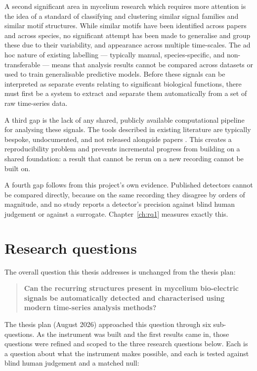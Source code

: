 A second significant area in mycelium research which requires more attention is the idea of a standard of classifying and clustering similar signal families and similar motif structures. While similar motifs have been identified across papers and across species, no significant attempt has been made to generalise and group these due to their variability, and appearance across multiple time-scales. The ad hoc nature of existing labelling --- typically manual, species-specific, and non-transferable --- means that analysis results cannot be compared across datasets or used to train generalisable predictive models. Before these signals can be interpreted as separate events relating to significant biological functions, there must first be a system to extract and separate them automatically from a set of raw time-series data.

A third gap is the lack of any shared, publicly available computational pipeline for analysing these signals. The tools described in existing literature are typically bespoke, undocumented, and not released alongside papers \cite{dehshibi,buffi2025review}. This creates a reproducibility problem and prevents incremental progress from building on a shared foundation: a result that cannot be rerun on a new recording cannot be built on.

A fourth gap follows from this project's own evidence. Published detectors cannot be compared directly, because on the same recording they disagree by orders of magnitude, and no study reports a detector's precision against blind human judgement or against a surrogate. Chapter~\ref{ch:rq1} measures exactly this.

\section{Research questions}
\label{sec:rqs}

The overall question this thesis addresses is unchanged from the thesis plan:

\begin{quote}
\textbf{Can the recurring structures present in mycelium bio-electric signals be automatically detected and characterised using modern time-series analysis methods?}
\end{quote}

The thesis plan (August 2026) approached this question through six sub-questions. As the instrument was built and the first results came in, those questions were refined and scoped to the three research questions below. Each is a question about what the instrument makes possible, and each is tested against blind human judgement and a matched null:


